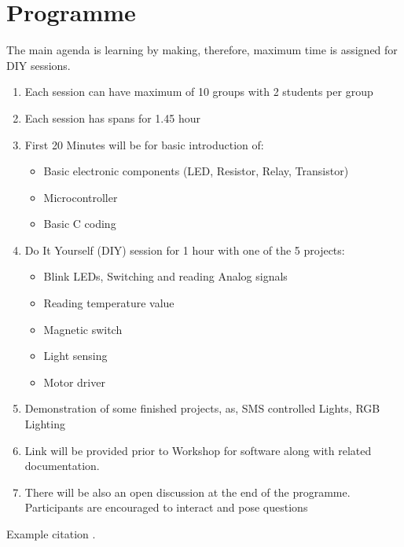 \documentclass[12pt]{article} %
\begin{document}
\section{Programme} %
The main agenda is learning by making, therefore, maximum time is assigned for DIY sessions.
\begin{enumerate}
\item Each session can have maximum of 10 groups with 2 students per group
\item Each session has spans for 1.45 hour
\item First 20 Minutes will be for basic introduction of:  
	\begin{itemize}
		\item Basic electronic components (LED, Resistor, Relay, Transistor)
		\item Microcontroller
		\item Basic C coding
	\end{itemize}
\item Do It Yourself (DIY) session for 1 hour with one of the 5 projects:
	\begin{itemize}
	\item Blink LEDs, Switching and reading Analog signals
	\item Reading temperature value
	\item Magnetic switch
	\item Light sensing
	\item Motor driver
	\end{itemize}
\item Demonstration of some finished projects, as, SMS controlled Lights, RGB Lighting
\item Link will be provided prior to Workshop for software along with related documentation.
\item There will be also an open discussion at the end of the programme. Participants are encouraged to interact and pose questions
\end{enumerate}

Example citation \cite{Figueredo:2009dg}.
\end{document}
